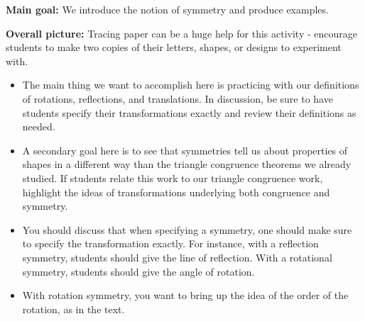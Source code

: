 \documentclass[nooutcomes, noauthor, handout]{ximera}
\begin{document}
\newpage
\begin{instructorNotes}

{\bf Main goal:} We introduce the notion of symmetry and produce examples.

{\bf Overall picture:} Tracing paper can be a huge help for this activity - encourage students to make two copies of their letters, shapes, or designs to experiment with.

\begin{itemize}
	\item The main thing we want to accomplish here is practicing with our definitions of rotations, reflections, and translations. In discussion, be sure to have students specify their transformations exactly and review their definitions as needed.
	\item A secondary goal here is to see that symmetries tell us about properties of shapes in a different way than the triangle congruence theorems we already studied. If students relate this work to our triangle congruence work, highlight the ideas of transformations underlying both congruence and symmetry.
	\item You should discuss that when specifying a symmetry, one should make sure to specify the transformation exactly.  For instance, with a reflection symmetry, students should give the line of reflection.  With a rotational symmetry, students should give the angle of rotation.
	\item With rotation symmetry, you want to bring up the idea of the order of the rotation, as in the text.
	

\end{itemize}
\end{instructorNotes}
\end{document}
